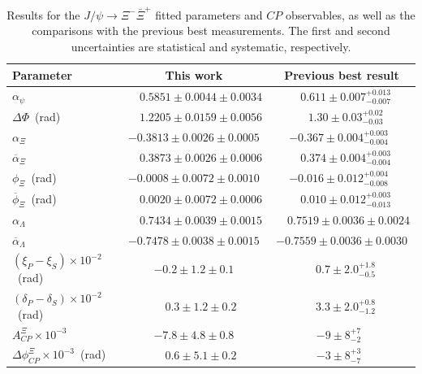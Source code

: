 \documentclass[aps,amsmath,amssymb,reprint]{revtex4-2}
\begin{document}
\begin{table}[hbtp]
\centering
\caption{
Results
for the $J/\psi\to\Xi^{-}\bar{\Xi}^+$ fitted parameters and $CP$ observables,
as well as the comparisons with the previous best measurements. The first and second uncertainties are statistical and systematic, respectively.}
\begin{tabular*}{\textwidth}{@{\extracolsep{\fill}}lcc}
\hline\hline
Parameter &\multicolumn{1}{c}{This work} & \multicolumn{1}{c}{Previous best result}  \\
\hline
$\alpha_{\psi}$ &               $\phantom{-}0.5851\pm0.0044\pm0.0034$ &    $\phantom{-}0.611 \pm 0.007 ^{+0.013}_{-0.007}$~\cite{BESIII:2023jhj}  \\
$\Delta\Phi$~(rad) &            $\phantom{-}1.2205\pm0.0159\pm0.0056$ &    $\phantom{-}1.30 \pm 0.03 ^{+0.02}_{-0.03}$~\cite{BESIII:2023jhj} \\
$\alpha_{\Xi}$ &                $-0.3813\pm0.0026\pm0.0005$           &    $-0.367 \pm 0.004 ^{+0.003}_{-0.004}$~\cite{BESIII:2023jhj}  \\
$\overline{\alpha}_{\Xi}$ &     $\phantom{-}0.3873\pm0.0026\pm0.0006$ &    $\phantom{-}0.374 \pm 0.004 ^{+0.003}_{-0.004}$~\cite{BESIII:2023jhj} \\
$\phi_{\Xi}$~(rad) &            $-0.0008\pm0.0072\pm0.0010$           &    $-0.016 \pm 0.012 ^{+0.004}_{-0.008}$~\cite{BESIII:2023jhj} \\
$\overline{\phi}_{\Xi}$~(rad) & $\phantom{-}0.0020\pm0.0072\pm0.0006$ &    $\phantom{-}0.010 \pm 0.012 ^{+0.003}_{-0.013}$~\cite{BESIII:2023jhj}  \\
$\alpha_{\Lambda}$ &            $\phantom{-}0.7434\pm0.0039\pm0.0015$ &    $\phantom{-}0.7519 \pm 0.0036\pm 0.0024$\hfill \cite{BESIII:2022qax}  \\
$\overline{\alpha}_{\Lambda}$ & $-0.7478\pm0.0038\pm0.0015$           &    $-0.7559 \pm 0.0036\pm 0.0030$\hfill \cite{BESIII:2022qax}  \\
\hline
$(\xi_P - \xi_S)\times10^{-2}$~(rad)               & $-0.2\pm1.2\pm0.1$             & $\phantom{-}0.7\pm2.0^{+1.8}_{-0.5}$~\cite{BESIII:2023jhj}  \\
$(\delta_P - \delta_S)\times10^{-2}$~(rad)         & $\phantom{-}0.3\pm1.2\pm0.2$   & $\phantom{-}3.3\pm2.0 ^{+0.8}_{-1.2}$~\cite{BESIII:2023jhj} \\
\hline
$A_{CP}^{\Xi}\times10^{-3}$                  & $-7.8\pm4.8\pm0.8$ & $-9\pm8^{+7}_{-2}$~\cite{BESIII:2023jhj} \\
$\Delta\phi_{CP}^{\Xi}\times10^{-3}$~(rad)   & $\phantom{-}0.6\pm5.1\pm0.2$ & $-3\pm8^{+3}_{-7}$~\cite{BESIII:2023jhj} \\

\end{tabular*}
\end{table}
\end{document}
